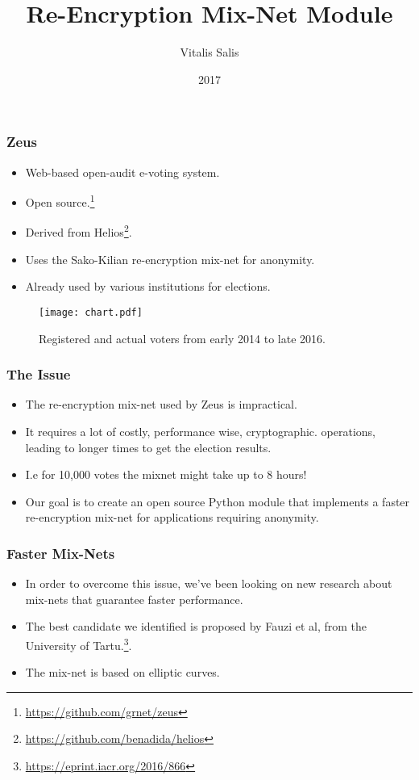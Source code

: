 \documentclass{beamer}
\title{Re-Encryption Mix-Net Module}
\author{Vitalis Salis}
\date{2017}
\begin{document}
    \frame{\titlepage}

    \begin{frame}
        \frametitle{Zeus}
        \begin{itemize}
            \item Web-based open-audit e-voting system.
            \item Open source.\footnote{\url{https://github.com/grnet/zeus}}
            \item Derived from Helios\footnote{
                \url{https://github.com/benadida/helios}
            }.
            \item Uses the Sako-Kilian re-encryption mix-net for anonymity.
            \item Already used by various institutions for elections.
        \end{itemize}
    \end{frame}

    \begin{frame}
        \begin{figure}
            \centering
            \texttt{[image: chart.pdf]}
            \caption{Registered and actual voters from early 2014 to late 2016.}
        \end{figure}
    \end{frame}

    \begin{frame}
        \frametitle{The Issue}
        \begin{itemize}
            \item The re-encryption mix-net used by Zeus is impractical.
            \item It requires a lot of costly, performance wise, cryptographic.
            operations, leading to longer times to get the election results.
            \item I.e for 10,000 votes the mixnet might take up to 8 hours!
            \item Our goal is to create an open source Python module that
            implements a faster re-encryption mix-net for applications
            requiring anonymity.
        \end{itemize}
    \end{frame}

    \begin{frame}
        \frametitle{Faster Mix-Nets}
        \begin{itemize}
            \item In order to overcome this issue, we've been looking on new
            research about mix-nets that guarantee faster performance.
            \item The best candidate we identified is proposed by Fauzi et al,
            from the University of Tartu.\footnote{
                \url{https://eprint.iacr.org/2016/866}
            }.
            \item The mix-net is based on elliptic curves.
        \end{itemize}
    \end{frame}
\end{document}

